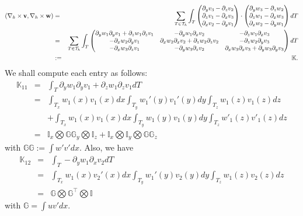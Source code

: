 \documentclass[final,leqno]{siamltex704}
\newcommand{\bv}{{\bf v}}
\def\bv{{\bf v}}
\def\bw{{\bf w}}
\begin{document}
\begin{eqnarray*}
(\nabla_h\times\bv,\nabla_h\times\bw)&=&\sum_{T\in\mathcal{T}_h}\int_T
	\begin{pmatrix}
	\partial_y v_3-\partial_zv_2\\ \partial_zv_1-\partial_xv_3\\ \partial_xv_2-\partial_yv_1
	\end{pmatrix}\cdot
	\begin{pmatrix}
	\partial_y w_3-\partial_zw_2\\ \partial_zw_1-\partial_xw_3\\ \partial_xw_2-\partial_yw_1
	\end{pmatrix}dT \\&=&\sum_{T\in\mathcal{T}_h}\int_T
\begin{pmatrix}
\partial_y w_1\partial_y v_1+\partial_z w_1\partial_z v_1 & -\partial_y w_1\partial_x v_2 & -\partial_zw_1\partial_xv_3\\
-\partial_xw_2\partial_yv_1 & \partial_xw_2\partial_xv_2+\partial_zw_2\partial_zv_2 &-\partial_zw_2\partial_yv_3\\
-\partial_xw_3\partial_zv_1 & -\partial_yw_3\partial_zv_2 & \partial_xw_3\partial_xv_3+\partial_yw_3\partial_yv_3
\end{pmatrix}dT\\
&:=&\mathbb{K}.
\end{eqnarray*}
We shall compute each entry as follows:
\begin{eqnarray*}
\mathbb{K}_{11} &=& \int_T\partial_y w_1\partial_y v_1+\partial_z w_1\partial_z v_1dT\\
&=&\int_{T_x}w_1(x)v_1(x)dx\int_{T_y} w_1'(y)v_1'(y)dy\int_{T_z}w_1(z)v_1(z)dz\\
&&+\int_{T_x}w_1(x)v_1(x)dx\int_{T_y} w_1(y)v_1(y)dy\int_{T_z}w'_1(z)v'_1(z)dz\\
&=&\mathbb{I}_x\bigotimes\mathbb{GG}_y\bigotimes\mathbb{I}_z+\mathbb{I}_x\bigotimes\mathbb{I}_y\bigotimes\mathbb{GG}_z
\end{eqnarray*}
with $\mathbb{GG}:=\int w'v'dx.$
Also, we have
\begin{eqnarray*}
\mathbb{K}_{12}&=& \int_T -\partial_y w_1\partial_x v_2dT\\
&=&\int_{T_x}w_1(x)v_2'(x)dx\int_{T_y}w_1'(y)v_2(y)dy\int_{T_z}w_1(z)v_2(z)dz\\
&=&\mathbb{G}\bigotimes\mathbb{G}^\top\bigotimes\mathbb{I}
\end{eqnarray*}
with $\mathbb{G}=\int uv'dx.$
\end{document}
